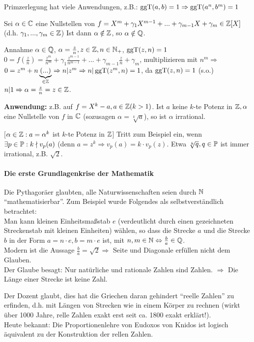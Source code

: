 \documentclass[a4paper,DIV15,BCOR12mm]{article}
\begin{document}
Primzerlegung hat viele Anwendungen, z.B.: $\mathop{\rm ggT}\nolimits(a,b) = 1
\Rightarrow \mathop{\rm ggT}\nolimits(a^n, b^m) = 1$

\begin{satz}[Irrationalitätskriterium]
Sei $\alpha \in \mathbb{C}$ eine Nullstellen von $f = X^m + \gamma_1
X^{m-1} + ... + \gamma_{m-1}X + \gamma_m \in \mathbb{Z}[X]$ (d.h.
$\gamma_1,...,\gamma_m \in \mathbb{Z}$) Ist dann $\alpha \notin \mathbb{Z}$, so
$\alpha \notin \mathbb{Q}$.
\end{satz}

\begin{beweis}
Annahme $\alpha \in \mathbb{Q}$, $\alpha = \frac{z}{n}, z \in \mathbb{Z}, n \in \mathbb{N}_+$, $\mathop{\rm ggT}\nolimits(z, n) = 1$\\
$0 = f(\frac{z}{n}) = \frac{z^m}{n^m} + \gamma_1\frac{z^{m-1}}{n^{m-1}} + ... + \gamma_{m-1}\frac{z}{n} + \gamma_m$, multiplizieren mit $n^m \Rightarrow$\\
$0 = z^m + n\underbrace{(...)}_{\in \mathbb{Z}} \Rightarrow n|z^m \Rightarrow n|\mathop{\rm ggT}\nolimits(z^m, n) = 1$, da $\mathop{\rm ggT}\nolimits(z, n) = 1$ (s.o.)\\
$n|1 \Rightarrow \alpha = \frac{z}{n} = z\in \mathbb{Z}$.
\end{beweis}

\textbf{Anwendung:} z.B. auf $f = X^k - a, a \in \mathbb{Z} (k > 1)$. Ist
$a$ keine $k$-te Potenz in $\mathbb{Z}, \alpha$ eine Nullstelle von $f$ in
$\mathbb{C}$ (sozusagen $\alpha = \sqrt[k]{a}$), so ist $\alpha$
irrational.

[$\alpha \in \mathbb{Z}: a = \alpha^k$ ist $k$-te Potenz in $\mathbb{Z}$] Tritt
zum Beispiel ein, wenn $\exists p \in \mathbb{P}: k \nmid v_p(a)$ (denn $a
= z^k \Rightarrow v_p(a) = k \cdot v_p(z)$. Etwa $\sqrt[k]{q}, q \in
\mathbb{P}$ ist immer irrational, z.B. $\sqrt{2}$.

\paragraph{Die erste Grundlagenkrise der Mathematik}
Die Pythagoräer glaubten, alle Naturwissenschaften seien durch $\mathbb{N}$ "`mathematisierbar"'. Zum Beispiel wurde Folgendes als selbstverständlich betrachtet:\\
Man kann kleinen Einheitsmaßstab $e$ (verdeutlicht durch einen gezeichneten Streckenstab mit kleinen Einheiten) wählen, so dass die Strecke $a$ und die Strecke $b$ in der Form $a = n \cdot e, b = m \cdot e$ ist, mit $n, m \in \mathbb{N} \Leftrightarrow \frac{b}{a} \in \mathbb{Q}$.\\
Modern ist die Aussage $\frac{b}{a} = \sqrt{2} \Rightarrow $ Seite und Diagonale erfüllen nicht dem Glauben.\\
Der Glaube besagt: Nur natürliche und rationale Zahlen sind Zahlen.
$\Rightarrow$ Die Länge einer Strecke ist keine Zahl.

Der Dozent glaubt, dies hat die Griechen daran gehindert "`reelle Zahlen"' zu erfinden, d.h. mit Längen von Strecken wie in einem Körper zu rechnen (wirkt über 1000 Jahre, relle Zahlen exakt erst seit ca. 1800 exakt erklärt!).\\
Heute bekannt: Die Proportionenlehre von Eudoxos von Knidos ist
logisch äquivalent zu der Konstruktion der rellen Zahlen.
\end{document}
